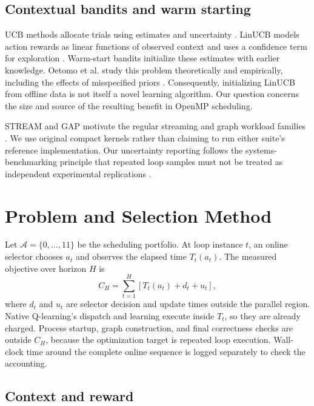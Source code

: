 \documentclass[10pt,letterpaper]{article}
\begin{document}
\subsection{Contextual bandits and warm starting}

UCB methods allocate trials using estimates and uncertainty
\cite{auer}. LinUCB models action rewards as linear functions of observed
context and uses a confidence term for exploration \cite{linucb}. Warm-start
bandits initialize these estimates with earlier knowledge. Oetomo et al.
study this problem theoretically and empirically, including the effects of
misspecified priors \cite{oetomo}. Consequently, initializing LinUCB from
offline data is not itself a novel learning algorithm. Our question concerns
the size and source of the resulting benefit in OpenMP scheduling.

STREAM and GAP motivate the regular streaming and graph workload families
\cite{stream,gap}. We use original compact kernels rather than claiming to run
either suite's reference implementation. Our uncertainty reporting follows the
systems-benchmarking principle that repeated loop samples must not be treated
as independent experimental replications \cite{kalibera}.

\section{Problem and Selection Method}

Let $\mathcal{A}=\{0,\ldots,11\}$ be the scheduling portfolio. At loop instance
$t$, an online selector chooses $a_t$ and observes the elapsed time
$T_t(a_t)$. The measured objective over horizon $H$ is
\begin{equation}
 C_H=\sum_{t=1}^{H}\left[T_t(a_t)+d_t+u_t\right],
 \label{eq:cost}
\end{equation}
where $d_t$ and $u_t$ are selector decision and update times outside the
parallel region. Native Q-learning's dispatch and learning execute inside
$T_t$, so they are already charged. Process startup, graph construction, and
final correctness checks are outside $C_H$, because the optimization target is
repeated loop execution. Wall-clock time around the complete online sequence
is logged separately to check the accounting.

\subsection{Context and reward}
\end{document}
